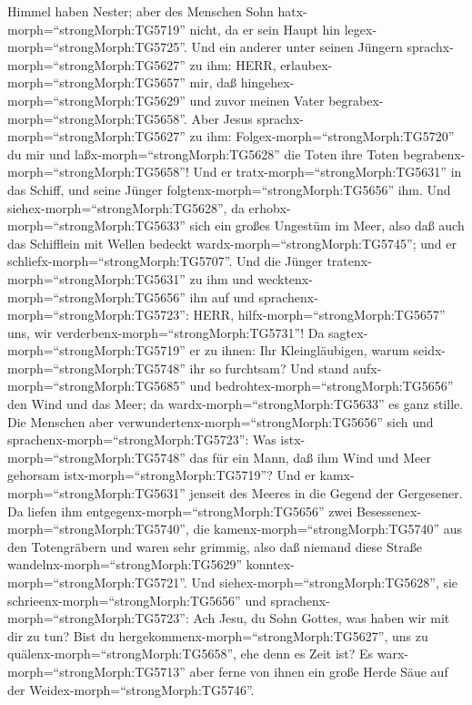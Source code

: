 Himmel haben Nester; aber des Menschen Sohn
hatx-morph=``strongMorph:TG5719'' nicht, da er sein Haupt hin
legex-morph=``strongMorph:TG5725''.  Und ein anderer unter
seinen Jüngern sprachx-morph=``strongMorph:TG5627'' zu ihm: HERR,
erlaubex-morph=``strongMorph:TG5657'' mir, daß
hingehex-morph=``strongMorph:TG5629'' und zuvor meinen Vater
begrabex-morph=``strongMorph:TG5658''.  Aber Jesus
sprachx-morph=``strongMorph:TG5627'' zu ihm:
Folgex-morph=``strongMorph:TG5720'' du mir und
laßx-morph=``strongMorph:TG5628'' die Toten ihre Toten
begrabenx-morph=``strongMorph:TG5658''!  Und er
tratx-morph=``strongMorph:TG5631'' in das Schiff, und seine Jünger
folgtenx-morph=``strongMorph:TG5656'' ihm.  Und
siehex-morph=``strongMorph:TG5628'', da
erhobx-morph=``strongMorph:TG5633'' sich ein großes Ungestüm im Meer,
also daß auch das Schifflein mit Wellen bedeckt
wardx-morph=``strongMorph:TG5745''; und er
schliefx-morph=``strongMorph:TG5707''.  Und die Jünger
tratenx-morph=``strongMorph:TG5631'' zu ihm und
wecktenx-morph=``strongMorph:TG5656'' ihn auf und
sprachenx-morph=``strongMorph:TG5723'': HERR,
hilfx-morph=``strongMorph:TG5657'' uns, wir
verderbenx-morph=``strongMorph:TG5731''!  Da
sagtex-morph=``strongMorph:TG5719'' er zu ihnen: Ihr Kleingläubigen,
warum seidx-morph=``strongMorph:TG5748'' ihr so furchtsam? Und stand
aufx-morph=``strongMorph:TG5685'' und
bedrohtex-morph=``strongMorph:TG5656'' den Wind und das Meer; da
wardx-morph=``strongMorph:TG5633'' es ganz stille.  Die
Menschen aber verwundertenx-morph=``strongMorph:TG5656'' sich und
sprachenx-morph=``strongMorph:TG5723'': Was
istx-morph=``strongMorph:TG5748'' das für ein Mann, daß ihm Wind und
Meer gehorsam istx-morph=``strongMorph:TG5719''?  Und er
kamx-morph=``strongMorph:TG5631'' jenseit des Meeres in die Gegend der
Gergesener. Da liefen ihm entgegenx-morph=``strongMorph:TG5656'' zwei
Besessenex-morph=``strongMorph:TG5740'', die
kamenx-morph=``strongMorph:TG5740'' aus den Totengräbern und waren sehr
grimmig, also daß niemand diese Straße
wandelnx-morph=``strongMorph:TG5629''
konntex-morph=``strongMorph:TG5721''.  Und
siehex-morph=``strongMorph:TG5628'', sie
schrieenx-morph=``strongMorph:TG5656'' und
sprachenx-morph=``strongMorph:TG5723'': Ach Jesu, du Sohn Gottes, was
haben wir mit dir zu tun? Bist du
hergekommenx-morph=``strongMorph:TG5627'', uns zu
quälenx-morph=``strongMorph:TG5658'', ehe denn es Zeit ist?
 Es warx-morph=``strongMorph:TG5713'' aber ferne von ihnen
ein große Herde Säue auf der Weidex-morph=``strongMorph:TG5746''.
